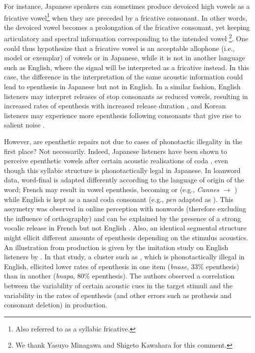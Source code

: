 For instance, Japanese speakers can sometimes produce devoiced high vowels as a fricative vowel\footnote{Also referred to as a syllabic fricative.} when they are preceded by a fricative consonant. In other words, the devoiced vowel becomes a prolongation of the fricative consonant, yet keeping articulatory and spectral information corresponding to the intended vowel \cite{matsui2017}\footnote{We thank Yasuyo Minagawa and Shigeto Kawahara for this comment.}. One could thus hypothesize that a fricative vowel is an acceptable allophone (i.e., model or exemplar) of vowels  or  in Japanese, while it is not in another language such as English, where the signal will be interpreted as a fricative instead. In this case, the difference in the interpretation of the same acoustic information could lead to epenthesis in Japanese but not in English. In a similar fashion, English listeners may interpret releases of stop consonants as reduced vowels, resulting in increased rates of epenthesis with increased release duration \cite{wilson2013}, and Korean listeners may experience more epenthesis following consonants that give rise to salient noise \cite{dejong2012}. 

However, are epenthetic repairs not due to cases of phonotactic illegality in the first place? Not necessarily. Indeed, Japanese listeners have been shown to perceive epenthetic vowels after certain acoustic realisations of coda \textipa{[n]}, even though this syllabic structure is phonotactically legal in Japanese. In loanword data, word-final \textipa{[n]} is adapted differently according to the language of origin of the word; French  may result in vowel epenthesis, becoming \textipa{[n:u]} or \textipa{[nu]} (e.g., \textit{Cannes}  $\rightarrow$ ) while English \textipa{[n]} is kept as a nasal coda consonant (e.g., \textit{pen} adapted as ). This assymetry was observed in online perception with nonwords (therefore excluding the influence of orthography) and can be explained by the presence of a strong vocalic release in French \textipa{[n]} but not English \textipa{[n]} \cite{peperkamp2008}.
Also, an identical segmental structure might ellicit different amounts of epenthesis depending on the stimulus acoustics. An illustration from production is given by the imitation study on English listeners by \cite{wilson2013}. In that study, a cluster such as , which is phonotactically illegal in English, ellicited lower rates of epenthesis in one item (\textit{bnase}, $33\%$ epenthesis) than in another (\textit{bnapa}, $80\%$ epenthesis). The authors observed a correlation between the variability of certain acoustic cues in the target stimuli and the variability in the rates of epenthesis (and other errors such as prothesis and consonant deletion) in production.

